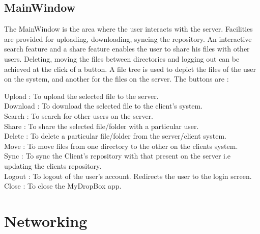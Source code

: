 \documentclass[]{article}
\begin{document}

\subsection{MainWindow}
The MainWindow is the area where the user interacts with the server. Facilities are provided for uploading, downloading, syncing the repository. An interactive search feature and a share feature enables the user to share his files with other users. Deleting, moving the files between directories and logging out can be achieved at the click of a button. A file tree is used to depict the files of the user on the system, and another for the files on the server.
The buttons are :

Upload		: To upload the selected file to the server.\\
Download		: To download the selected file to the client's system.\\
Search		: To search for other users on the server.\\
Share		: To share the selected file/folder with a particular user.\\
Delete		: To delete a particular file/folder from the server/client system.\\
Move			: To move files from one directory to the other on the clients system.\\
Sync			: To sync the Client's repository with that present on the server i.e updating the clients repository.\\
Logout		: To logout of the user's account. Redirects the user to the login screen.\\
Close		
: To close the MyDropBox app.

\section{Networking}
\end{document}
